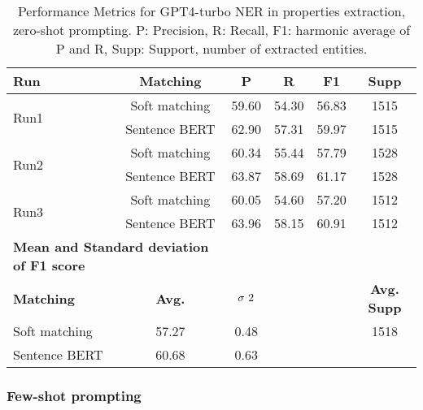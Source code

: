 \begin{table}[htbp]
\small
  \centering
  \caption{Performance Metrics for GPT4-turbo NER in properties extraction, zero-shot prompting. P: Precision, R: Recall, F1: harmonic average of P and R, Supp: Support, number of extracted entities.}
  \begin{tabular}{lccccc}
    \toprule
    \textbf{Run} & \textbf{Matching} & \textbf{P} & \textbf{R} & \textbf{F1} & \textbf{Supp} \\
    \midrule
    \multirow{2}{*}{Run1} & Soft matching & 59.60 & 54.30 & 56.83 & 1515 \\
    & Sentence BERT & 62.90 & 57.31 & 59.97 & 1515 \\
    \midrule        
    \multirow{2}{*}{Run2} & Soft matching & 60.34 & 55.44 & 57.79 & 1528 \\
    & Sentence BERT & 63.87 & 58.69 & 61.17 & 1528 \\
    \midrule        
    \multirow{2}{*}{Run3} & Soft matching & 60.05 & 54.60 & 57.20 & 1512 \\    
    & Sentence BERT & 63.96 & 58.15 & 60.91 & 1512 \\
    \midrule
    \multicolumn{2}{l}{\textbf{Mean and Standard deviation of F1 score}} & & & & \\
    \midrule
    \textbf{Matching} & \textbf{Avg.} & $\sigma\textsuperscript{2}$ & & & \textbf{Avg. Supp}\\
    Soft matching & 57.27 & 0.48 & & & 1518 \\
    Sentence BERT & 60.68 & 0.63 & & & \\
    \bottomrule
  \end{tabular}
\end{table}

\clearpage
\subsubsection{Few-shot prompting }

